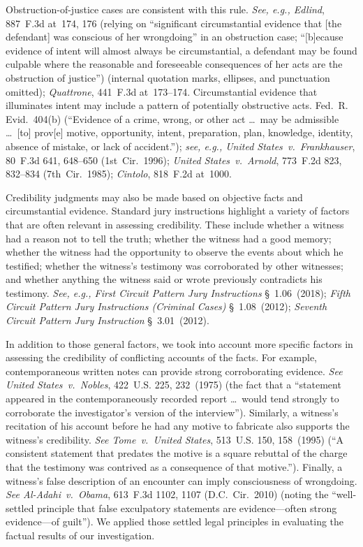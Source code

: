 Obstruction-of-justice cases are consistent with this rule.
\textit{See, e.g., Edlind}, 887~F.3d at~174, 176 (relying on ``significant circumstantial evidence that [the defendant] was conscious of her wrongdoing'' in an obstruction case; ``[b]ecause evidence of intent will almost always be circumstantial, a defendant may be found culpable where the reasonable and foreseeable consequences of her acts are the obstruction of justice'') (internal quotation marks, ellipses, and punctuation omitted);
\textit{Quattrone}, 441~F.3d at~173--174.
Circumstantial evidence that illuminates intent may include a pattern of potentially obstructive acts. Fed.~R. Evid.~404(b) (``Evidence of a crime, wrong, or other act \dots\ may be admissible \dots\ [to] prov[e] motive, opportunity, intent, preparation, plan, knowledge, identity, absence of mistake, or lack of accident.'');
\textit{see, e.g., United States~v.\ Frankhauser}, 80~F.3d 641, 648--650 (1st~Cir.~1996);
\textit{United States~v.\ Arnold}, 773~F.2d 823, 832--834 (7th~Cir.~1985);
\textit{Cintolo}, 818~F.2d at~1000.

Credibility judgments may also be made based on objective facts and circumstantial evidence.
Standard jury instructions highlight a variety of factors that are often relevant in assessing credibility.
These include whether a witness had a reason not to tell the truth; whether the witness had a good memory;
whether the witness had the opportunity to observe the events about which he testified;
whether the witness's testimony was corroborated by other witnesses;
and whether anything the witness said or wrote previously contradicts his testimony.
\textit{See, e.g., First Circuit Pattern Jury Instructions} \S~1.06~(2018);
\textit{Fifth Circuit Pattern Jury Instructions (Criminal Cases)} \S~1.08~(2012);
\textit{Seventh Circuit Pattern Jury Instruction} \S~3.01~(2012).

In addition to those general factors, we took into account more specific factors in assessing the credibility of conflicting accounts of the facts.
For example, contemporaneous written notes can provide strong corroborating evidence.
\textit{See United States~v.\ Nobles}, 422~U.S. 225, 232~(1975) (the fact that a ``statement appeared in the contemporaneously recorded report \dots\ would tend strongly to corroborate the investigator's version of the interview'').
Similarly, a witness's recitation of his account before he had any motive to fabricate also supports the witness's credibility.
\textit{See Tome~v.\ United States}, 513~U.S. 150, 158~(1995) (``A consistent statement that predates the motive is a square rebuttal of the charge that the testimony was contrived as a consequence of that motive.'').
Finally, a witness's false description of an encounter can imply consciousness of wrongdoing.
\textit{See Al-Adahi~v.\ Obama}, 613~F.3d 1102, 1107 (D.C.~Cir.~2010) (noting the ``well-settled principle that false exculpatory statements are evidence---often strong evidence---of guilt'').
We applied those settled legal principles in evaluating the factual results of our investigation.
